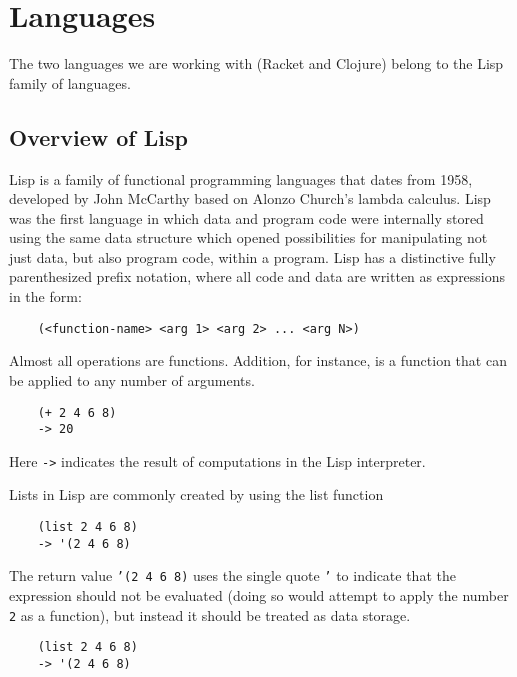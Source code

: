 \documentclass[12pt]{article}
\newcommand{\comment}[1]{{\bf \tt  {#1}}}
\newcommand{\emcomment}[1]{\textcolor{ForestGreen}{\comment{Elena: {#1}}}}
\newcommand{\hfcomment}[1]{\textcolor{Teal}{\comment{Henry: {#1}}}}
\begin{document}

\section{Languages}\label{sec:lang}
The two languages we are working with (Racket and Clojure) belong to the Lisp family of languages. 

	\subsection{Overview of Lisp}\label{sec:lisp}

	Lisp is a family of functional programming languages that dates from 1958, developed by John McCarthy based on Alonzo Church's lambda calculus.
	Lisp was the first language in which data and program code were internally stored using the same data structure which opened possibilities for manipulating not just data, but also program code, within a program.
	Lisp has a distinctive fully parenthesized prefix notation, where all code and data are written as expressions in the form:
	\begin{verbatim}
	(<function-name> <arg 1> <arg 2> ... <arg N>)
	\end{verbatim}
Almost all operations are functions. Addition, for instance, is a function that can be applied to any number of arguments.
	\begin{verbatim}
	(+ 2 4 6 8)
	-> 20
	\end{verbatim}
Here \texttt{->} indicates the result of computations in the Lisp interpreter. 

Lists in Lisp are commonly created by using the list function
 	\begin{verbatim}
	(list 2 4 6 8)
	-> '(2 4 6 8)
	\end{verbatim}
The return value \texttt{'(2 4 6 8)} uses the single quote \texttt{'} to indicate that the expression should not be evaluated (doing so would attempt to apply the number \texttt{2} as a function), but instead it should be treated as data storage. 
	\begin{verbatim}
	(list 2 4 6 8)
	-> '(2 4 6 8)
	\end{verbatim}
	
\end{document}
